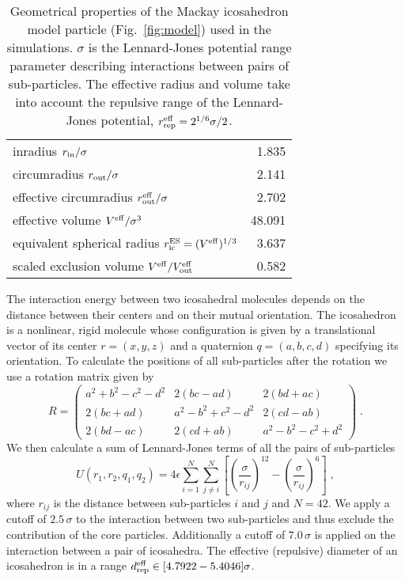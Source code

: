 \documentclass[10pt,aps,pre,twocolumn,superscriptaddress,amsmath,amssymb]{revtex4-1}
\begin{document}
\begin{table}
  \centering
  \begin{tabular}{lr}
    \hline
    inradius $r_{\rm in}/\sigma$ & 1.835 \\
    circumradius $r_{\rm out}/\sigma$ & 2.141 \\
    effective circumradius $r_{\rm out}^{\rm eff}/\sigma$ & 2.702 \\
    effective volume $V^{\rm eff}/\sigma^3$ & 48.091 \\
    equivalent spherical radius $r_{\rm ic}^{\rm ES}=(V^{\rm eff})^{1/3}$ & 3.637 \\
    scaled exclusion volume $V^{\rm eff}/V_{\rm out}^{\rm eff}$ & 0.582\\
    \hline
  \end{tabular}
  \caption{Geometrical properties of the Mackay icosahedron model particle (Fig.~\ref{fig:model}) used in the simulations. $\sigma$ is the Lennard-Jones potential range parameter describing interactions between pairs of sub-particles. The effective radius and volume take into account the repulsive range of the Lennard-Jones potential, $r_{\rm rep}^{\rm eff}=2^{1/6}\sigma/2$.}
  \label{tab:1}
\end{table}

The interaction energy between two icosahedral molecules depends on the distance between their centers and on their mutual orientation.
The icosahedron is a nonlinear, rigid molecule whose configuration is given by a translational vector of its center $r=(x,y,z)$ and a quaternion $q=(a,b,c,d)$ specifying its orientation.
To calculate the positions of all sub-particles after the rotation we use a rotation matrix given by
\begin{equation}
  R=\left(
  \begin{matrix}
    a^2+b^2-c^2-d^2 & 2(bc-ad) & 2(bd+ac) \\
    2(bc+ad) & a^2-b^2+c^2-d^2 & 2(cd-ab) \\
    2(bd-ac) & 2(cd+ab) & a^2-b^2-c^2+d^2
  \end{matrix}
  \right)\;.
\end{equation}
We then calculate a sum of Lennard-Jones terms of all the pairs of sub-particles
\begin{equation}
U(r_1,r_2,q_1,q_2)=4\epsilon\sum\limits_{i=1}^{N}\sum\limits_{j\ne i}^{N}\left[\left(\frac{\sigma}{r_{ij}}\right)^{12}-\left(\frac{\sigma}{r_{ij}}\right)^{6}\right]\;,
\end{equation}
where $r_{ij}$ is the distance between sub-particles $i$ and $j$ and $N=42$.
We apply a cutoff of $2.5\,\sigma$ to the interaction between two sub-particles and thus exclude the contribution of the core particles.
Additionally a cutoff of $7.0\,\sigma$ is applied on the interaction between a pair of icosahedra.
%
The effective (repulsive) diameter of an icosahedron is in a range $d_{\rm rep}^{\rm eff}\in[4.7922-5.4046]\sigma$.
\end{document}
